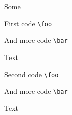 \documentclass{article}
\begin{document}
Some

\begin{scontents}[print-env=true]
    First code \verb|\foo|

    And more code \verb|\bar|
\end{scontents}

Text

\begin{scontents}[print-env=true]
    Second code \verb|\foo|

    And more code \verb|\bar|
\end{scontents}

Text


{}

{}

{}
\end{document}
